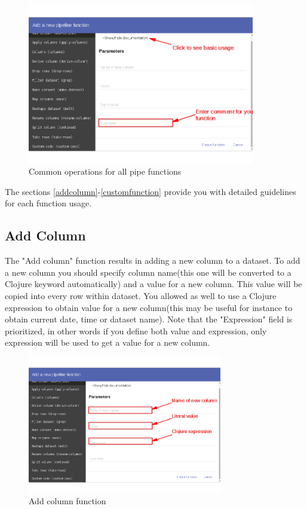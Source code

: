 \documentclass[USenglish]{article}
\begin{document}
 \begin{center}
\begin{figure}[!htbp]
\centering
\includegraphics[height=7cm] {pipefunccommon.png}
 \caption{Common operations for all pipe functions \label{meta}}
\end{figure}
\end{center}

  The sections \ref{addcolumn}-\ref{customfunction} provide you with detailed guidelines for each function usage.


\subsection{Add Column \label{addcolumn}}
The "Add column" function results in adding a new column to a dataset. To add a new column you should specify column name(this one will be converted to a Clojure keyword automatically) and a value for a new column. This value will be copied into every row within dataset. You allowed as well to use a Clojure expression to obtain value for a new column(this may be useful for instance to obtain current date, time or dataset name). Note that the "Expression" field is prioritized, in other words if you define both value and expression, only expression will be used to get a value for a new column.
 \begin{center}
\begin{figure}[!htbp]
\centering
\includegraphics[height=6cm] {addcolumnf.png}
 \caption{Add column function \label{meta}}
\end{figure}
\end{center}
\end{document}
